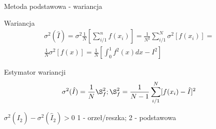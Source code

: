 \begin{frame}{Metoda podstawowa - wariancja}
	\vspace{-.5cm}
	\begin{block}{Wariancja}
		\begin{align*}
			\sigma^2(\hat{I}) = 
            \sigma^2 \frac{1}{N} \left[ 
            	\sum_{i/1}^n f(x_i)
            	\right] =
            \frac{1}{N^2} \sum_{i/1}^N \sigma^2 [f(x_i)] =
            \\
            \frac{1}{N} \sigma^2 [f(x)] = 
            \frac{1}{N} \left[ 
            	\int_0^1 f^2(x)dx - I^2
            	\right]
		\end{align*}
	\end{block}
    
    \begin{block}{Estymator wariancji}
    	\[
        	\sigma^2(\hat{I}) = \frac{1}{N} \S_f^2; 
            \S_f^2 = \frac{1}{N-1} \sum_{i/1}^N [f(x_i) - \hat{I}]^2
        \]
    \end{block}
    
    $\sigma^2(\hat{I}_2) - \sigma^2(\hat{I}_2) > 0$ \hspace{.5cm}
    1 - orzeł/reszka; \hspace{.5cm}
    2 - podstawowa
\end{frame}